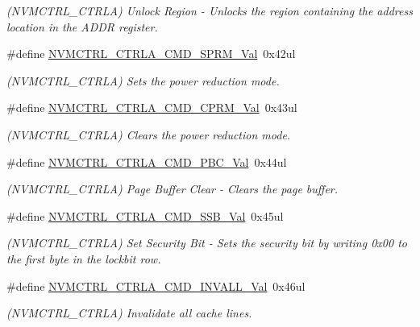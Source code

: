 \begin{DoxyCompactItemize}
\begin{DoxyCompactList}\small\item\em (N\+V\+M\+C\+T\+R\+L\+\_\+\+C\+T\+R\+LA) Unlock Region -\/ Unlocks the region containing the address location in the A\+D\+DR register. \end{DoxyCompactList}\item 
\#define \mbox{\hyperlink{group___s_a_m_d21___n_v_m_c_t_r_l_ga5e5184e115f92e2037793f468f07e912}{N\+V\+M\+C\+T\+R\+L\+\_\+\+C\+T\+R\+L\+A\+\_\+\+C\+M\+D\+\_\+\+S\+P\+R\+M\+\_\+\+Val}}~0x42ul
\begin{DoxyCompactList}\small\item\em (N\+V\+M\+C\+T\+R\+L\+\_\+\+C\+T\+R\+LA) Sets the power reduction mode. \end{DoxyCompactList}\item 
\#define \mbox{\hyperlink{group___s_a_m_d21___n_v_m_c_t_r_l_ga5af4406a70755e9869cbddf9aeccba45}{N\+V\+M\+C\+T\+R\+L\+\_\+\+C\+T\+R\+L\+A\+\_\+\+C\+M\+D\+\_\+\+C\+P\+R\+M\+\_\+\+Val}}~0x43ul
\begin{DoxyCompactList}\small\item\em (N\+V\+M\+C\+T\+R\+L\+\_\+\+C\+T\+R\+LA) Clears the power reduction mode. \end{DoxyCompactList}\item 
\#define \mbox{\hyperlink{group___s_a_m_d21___n_v_m_c_t_r_l_gaa88d2aeae32e10443a0e9dc516dfbf44}{N\+V\+M\+C\+T\+R\+L\+\_\+\+C\+T\+R\+L\+A\+\_\+\+C\+M\+D\+\_\+\+P\+B\+C\+\_\+\+Val}}~0x44ul
\begin{DoxyCompactList}\small\item\em (N\+V\+M\+C\+T\+R\+L\+\_\+\+C\+T\+R\+LA) Page Buffer Clear -\/ Clears the page buffer. \end{DoxyCompactList}\item 
\#define \mbox{\hyperlink{group___s_a_m_d21___n_v_m_c_t_r_l_ga9192307a9292a8144f18adfe8ea0d3f0}{N\+V\+M\+C\+T\+R\+L\+\_\+\+C\+T\+R\+L\+A\+\_\+\+C\+M\+D\+\_\+\+S\+S\+B\+\_\+\+Val}}~0x45ul
\begin{DoxyCompactList}\small\item\em (N\+V\+M\+C\+T\+R\+L\+\_\+\+C\+T\+R\+LA) Set Security Bit -\/ Sets the security bit by writing 0x00 to the first byte in the lockbit row. \end{DoxyCompactList}\item 
\#define \mbox{\hyperlink{group___s_a_m_d21___n_v_m_c_t_r_l_ga0bef792b0234a40587a3dd7254e1764d}{N\+V\+M\+C\+T\+R\+L\+\_\+\+C\+T\+R\+L\+A\+\_\+\+C\+M\+D\+\_\+\+I\+N\+V\+A\+L\+L\+\_\+\+Val}}~0x46ul
\begin{DoxyCompactList}\small\item\em (N\+V\+M\+C\+T\+R\+L\+\_\+\+C\+T\+R\+LA) Invalidate all cache lines. \end{DoxyCompactList}\item 

\end{DoxyCompactItemize}
